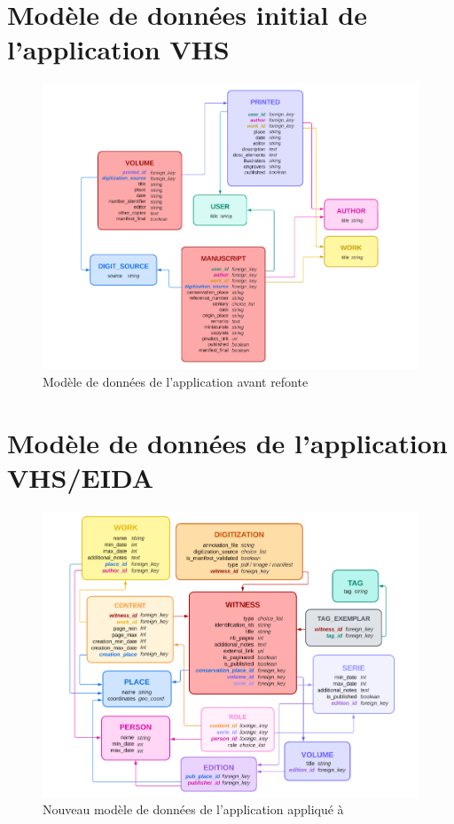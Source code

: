 \section{Modèle de données initial de l'application VHS}
	\begin{figure}[H]
		\centering
		\includegraphics[width=16cm]{images/vhs_data_model.png}
		\caption{Modèle de données de l'application \vhs avant refonte}
		\label{fig:vhs_data_model}
	\end{figure}

\section{Modèle de données de l'application VHS/EIDA}
	\begin{figure}[H]
		\centering
		\includegraphics[width=16cm]{images/eida_data_model.png}
		\caption{Nouveau modèle de données de l'application \eida appliqué à \vhs}
		\label{fig:eida_data_model}
	\end{figure}